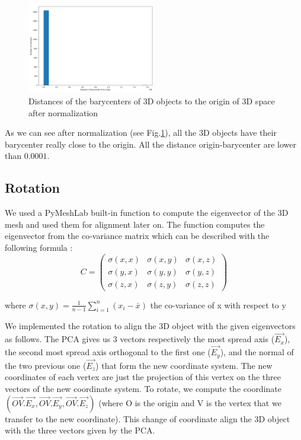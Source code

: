 \documentclass[10pt,twocolumn,letterpaper]{article}
\begin{document}
\begin{figure}[h!]
\begin{center}
  \includegraphics[width=0.5\textwidth]{picture/Normalised barycenter}
  \caption{Distances of the barycenters of 3D objects to the origin of 3D space after normalization}
  \label{fig:barycenter-after}
  \end{center}
\end{figure}

As we can see after normalization (see Fig.\ref{fig:barycenter-after}),  all the 3D objects have their barycenter really close to the origin. All the distance origin-barycenter are lower than $0.0001$.

\subsection{Rotation}

	We used a PyMeshLab built-in function to compute the eigenvector of the 3D mesh and used them for alignment later on. The function computes the eigenvector from the co-variance matrix which can be described  with the following formula :
	$$ C = \begin{pmatrix}
   \sigma(x,x) & \sigma(x,y) & \sigma(x,z) \\
   \sigma(y,x) & \sigma(y,y) & \sigma(y,z) \\
   \sigma(z,x) & \sigma(z,y) & \sigma(z,z)
\end{pmatrix} $$

where $ \sigma(x,y) = \frac{1}{n-1} \sum\limits_{i=1}^n ( x_i - \bar{x} ) $ the co-variance of x with respect to y
	
	We implemented the rotation to align the 3D object with the given eigenvectors as follows. The PCA gives us 3 vectors respectively the most spread axis ($\overrightarrow{E_x}$), the second most spread axis orthogonal to the first one ($\overrightarrow{E_y}$), and the normal of the two previous one ($\overrightarrow{E_z}$) that form the new coordinate system. The new coordinates of each vertex are just the projection of this vertex on the three vectors of the new coordinate system. To rotate, we compute the coordinate $(\overrightarrow{OV}.\overrightarrow{E_x}, \overrightarrow{OV}.\overrightarrow{E_y}, \overrightarrow{OV}.\overrightarrow{E_z})$ (where O is the origin and V is the vertex that we transfer to the new coordinate). This change of coordinate align the 3D object with the three vectors given by the PCA.
	
\end{document}
